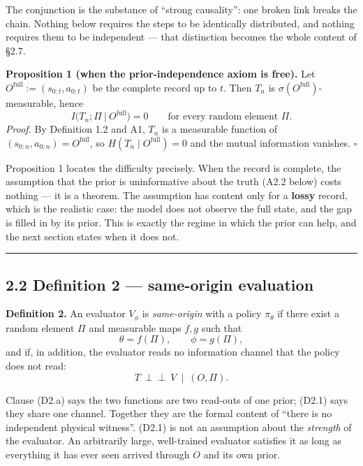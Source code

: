\documentclass[11pt,a4paper]{article}
\begin{document}
The conjunction is the substance of ``strong causality'': one broken link breaks the
chain. Nothing below requires the steps to be identically distributed, and
nothing requires them to be independent --- that distinction becomes the whole
content of §2.7.

\textbf{Proposition 1 (when the prior-independence axiom is free).} Let
\(O^{\mathrm{full}}:=(s_{0:t},a_{0:t})\) be the complete record up to \(t\). Then
\(T_n\) is \(\sigma(O^{\mathrm{full}})\)-measurable, hence
\begin{equation}
I\big(T_n;\Pi\ \big|\ O^{\mathrm{full}}\big)=0
\qquad\text{for every random element }\Pi .
\tag{2.1.2}
\end{equation}
\emph{Proof.} By Definition 1.2 and A1, \(T_n\) is a measurable function of
\((s_{0:n},a_{0:n})=O^{\mathrm{full}}\), so \(H(T_n\mid O^{\mathrm{full}})=0\) and the
mutual information vanishes. \(\square\)

Proposition 1 locates the difficulty precisely. When the record is complete,
the assumption that the prior is uninformative about the truth (A2.2 below) costs
nothing --- it is a theorem. The assumption has content only for a \textbf{lossy} record,
which is the realistic case: the model does not observe the full state, and the
gap is filled in by its prior. This is exactly the regime in which the prior can
help, and the next section states when it does not.

\begin{center}\rule{0.5\linewidth}{0.5pt}\end{center}

\subsection{2.2 Definition 2 --- same-origin evaluation}\label{definition-2-same-origin-evaluation}

\textbf{Definition 2.} An evaluator \(V_\phi\) is \emph{same-origin} with a policy
\(\pi_\theta\) if there exist a random element \(\Pi\) and measurable maps \(f,g\) such
that
\begin{equation}
\theta=f(\Pi),\qquad \phi=g(\Pi),
\tag{D2.a}
\end{equation}
and if, in addition, the evaluator reads no information channel that the policy
does not read:
\begin{equation}
T\ \perp\!\!\!\perp\ V\ \mid\ (O,\Pi).
\tag{D2.1}
\end{equation}

Clause (D2.a) says the two functions are two read-outs of one prior; (D2.1) says
they share one channel. Together they are the formal content of ``there is no
independent physical witness''. (D2.1) is not an assumption about the \emph{strength} of
the evaluator. An arbitrarily large, well-trained evaluator satisfies it as long
as everything it has ever seen arrived through \(O\) and its own prior.
\end{document}
